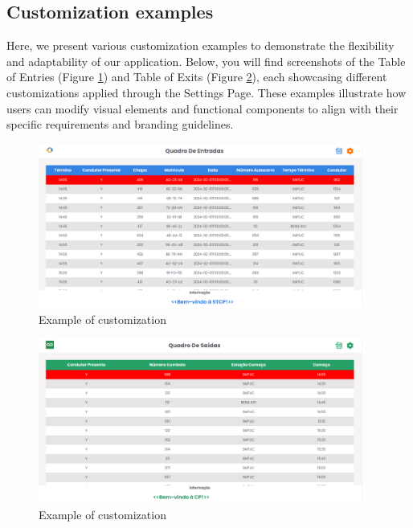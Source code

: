 \documentclass[10pt]{article}
\begin{document}
        \subsection{Customization examples}

        Here, we present various customization examples to demonstrate the flexibility and adaptability of our application. Below, you will find screenshots of the Table of Entries (Figure \ref{fig:table_of_entries_stcp1}) and Table of Exits (Figure \ref{fig:table_of_exits_cp}), each showcasing different customizations applied through the Settings Page. These examples illustrate how users can modify visual elements and functional components to align with their specific requirements and branding guidelines.
        \vfill
        \begin{figure}[H]
            \centering
            \includegraphics[width=0.95\textwidth]{table_of_entries_stcp1}
            \caption{Example of customization}
            \label{fig:table_of_entries_stcp1}
        \end{figure}

        \begin{figure}[H]
            \centering
            \includegraphics[width=0.95\textwidth]{table_of_exits_cp}
            \caption{Example of customization}
            \label{fig:table_of_exits_cp}
        \end{figure}
\end{document}
